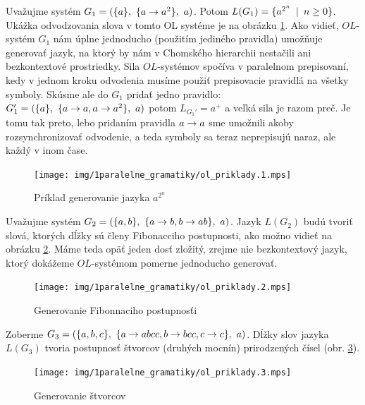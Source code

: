 \begin{priklad}
  Uvažujme systém $G_1=(\{ a \},\ \{ a \rightarrow a^2\},\ a)$.
  Potom $L(G_1)=\{ a^{2^n} \enspace |\enspace n \ge 0\}$.
  Ukážka odvodzovania slova v tomto OL systéme je na obrázku 
  \ref{img:ol_priklad_1}.
  Ako vidieť, $OL$-systém $G_1$ nám úplne jednoducho 
  (použitím jediného pravidla) umožňuje
  generovať jazyk, na ktorý by nám v Chomského hierarchii
  nestačili ani bezkontextové prostriedky.
  Sila $OL$-systémov spočíva v paralelnom prepisovaní,
  kedy v jednom kroku odvodenia
  musíme použiť prepisovacie pravidlá na všetky symboly.
  Skúsme ale do $G_1$ pridať jedno pravidlo:\\
  $G_{1}'=(\{ a \},\ \{ a\rightarrow a,
  a \rightarrow a^2 \},\ a)$ potom $L_{G_1'}=a^{+}$ a veľká sila je razom
  preč. Je tomu tak preto, lebo pridaním pravidla $a\rightarrow a$ sme
  umožnili akoby rozsynchronizovať odvodenie, a teda symboly sa
  teraz neprepisujú naraz, ale každý v inom čase.

  \begin{figure}[htp]
    \centering
    \texttt{[image: img/1paralelne\_gramatiky/ol\_priklady.1.mps]}
    \caption{Príklad generovanie jazyka $a^{2^n}$}
    \label{img:ol_priklad_1}
  \end{figure}
\end{priklad}


\begin{priklad}
  Uvažujme systém $G_{2}=(\{a,b\},\ \{ a \rightarrow b, b \rightarrow ab \},
      \ a)$.
  Jazyk $L(G_{2})$ budú
  tvoriť slová, ktorých dĺžky sú členy Fibonacciho postupnosti, ako
  možno vidieť na obrázku \ref{img:ol_priklad_2}. Máme teda
  opäť jeden dosť zložitý, zrejme nie bezkontextový jazyk,
  ktorý dokážeme $OL$-systémom pomerne jednoducho generovať.
  \begin{figure}[htp]
    \centering
    \texttt{[image: img/1paralelne\_gramatiky/ol\_priklady.2.mps]}
    \caption{Generovanie Fibonnaciho postupnosťi}
    \label{img:ol_priklad_2}
  \end{figure}
\end{priklad}


\begin{priklad}
  Zoberme $G_3=(\{a,b,c\},\ \{a \rightarrow abcc,b \rightarrow bcc,
      c \rightarrow c\},\ a)$. Dĺžky
  slov jazyka $L(G_3)$ tvoria postupnosť štvorcov (druhých mocnín)
  prirodzených čísel (obr. \ref{img:ol_priklad_3}).

  \begin{figure}[htp]
    \centering
    \texttt{[image: img/1paralelne\_gramatiky/ol\_priklady.3.mps]}
    \caption{Generovanie štvorcov}
    \label{img:ol_priklad_3}
  \end{figure}
\end{priklad}

